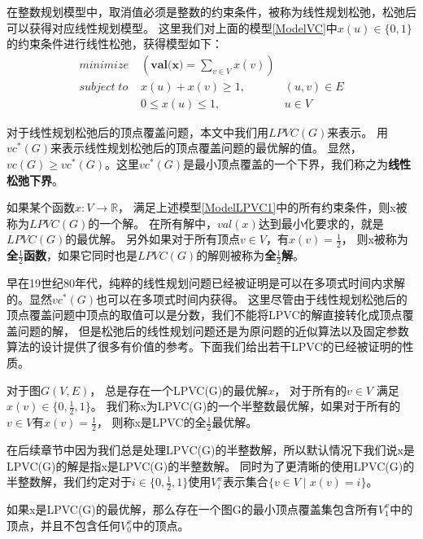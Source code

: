 在整数规划模型中，取消值必须是整数的约束条件，被称为线性规划松弛，松弛后可以获得对应线性规划模型。
这里我们对上面的模型\ref{ModelVC}中$x(u) \in \{0, 1\}$的约束条件进行线性松弛，获得模型如下：
\begin{equation} \label{ModelLPVC1} \begin{aligned}
  minimize\; & (\textbf{val(x)} = \sum_{v \in V}{x(v)}) &\\
  subject\; to\; & x(u) + x(v) \ge 1, &(u, v) \in E \\
   & 0 \le x(u) \le 1, & u \in V
\end{aligned} \end{equation}

对于线性规划松弛后的顶点覆盖问题，本文中我们用$LPVC(G)$来表示。
用$vc^{*}(G)$来表示线性规划松弛后的顶点覆盖问题的最优解的值。
显然，$vc(G) \ge vc^*(G)$。这里$vc^{*}(G)$是最小顶点覆盖的一个下界，我们称之为\textbf{线性松弛下界}。

如果某个函数$x:V \rightarrow \mathbb{R}$， 满足上述模型\ref{ModelLPVC1}中的所有约束条件，则x被称为$LPVC(G)$的一个解。
在所有解中，$val(x)$达到最小化要求的，就是$LPVC(G)$的最优解。
另外如果对于所有顶点$v \in V$，有$x(v) = \frac{1}{2}$，
则x被称为\textbf{全$\frac{1}{2}$函数}，如果它同时也是$LPVC(G)$的解则被称为\textbf{全$\frac{1}{2}$解}。



早在19世纪80年代，纯粹的线性规划问题已经被证明是可以在多项式时间内求解的\cite{khachiian1979polynomial}。显然$vc^{*}(G)$也可以在多项式时间内获得。
这里尽管由于线性规划松弛后的顶点覆盖问题中顶点的取值可以是分数，我们不能将LPVC的解直接转化成顶点覆盖问题的解，
但是松弛后的线性规划问题还是为原问题的近似算法以及固定参数算法的设计提供了很多有价值的参考。下面我们给出若干LPVC的已经被证明的性质。
\begin{lemma}
对于图$G(V, E)$， 总是存在一个LPVC(G)的最优解$x$， 对于所有的$v \in V$ 满足$x(v) \in \{0, \frac{1}{2}, 1\}$。
我们称x为LPVC(G)的一个半整数最优解，如果对于所有的$v \in V$有$x(v) = \frac{1}{2}$， 则称x是LPVC的全$\frac{1}{2}$最优解。
\end{lemma}

在后续章节中因为我们总是处理LPVC(G)的半整数解，所以默认情况下我们说x是LPVC(G)的解是指x是LPVC(G)的半整数解。
同时为了更清晰的使用LPVC(G)的半整数解，我们约定对于$i \in \{0, \frac{1}{2}, 1\}$使用$V^x_i$表示集合$\{v \in V\;|\; x(v) = i\}$。

\begin{lemma}\label{relationBwtVCAndLPVC}
如果x是LPVC(G)的最优解，那么存在一个图G的最小顶点覆盖集包含所有$V^x_1$中的顶点，并且不包含任何$V^x_0$中的顶点。
\end{lemma}

